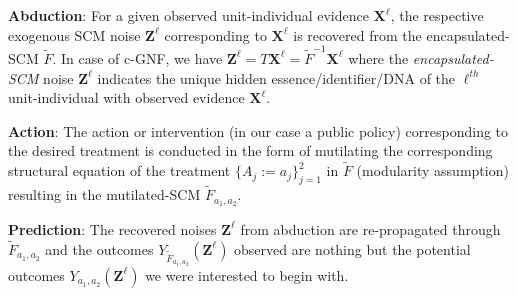 \documentclass[letterpaper]{article} %
\begin{document}
\begin{inparaenum}

    \item \textbf{Abduction}: For a given observed unit-individual evidence $\mathbf{X}^\ell$, the respective exogenous SCM noise $\mathbf{Z}^\ell$ corresponding to $\mathbf{X}^\ell$ is recovered from the encapsulated-SCM $\tilde{F}$. In case of c-GNF, we have $\mathbf{Z}^\ell{ = }T\mathbf{X}^\ell{ = }\tilde{F}^{-1}\mathbf{X}^\ell$ where the \emph{encapsulated-SCM} noise $\mathbf{Z}^\ell$ 
   indicates the unique hidden essence/identifier/DNA
    of the $\ell^{th}$ unit-individual with observed evidence $\mathbf{X}^\ell$.
    
    \item \textbf{Action}: The action or intervention (in our case a public policy) corresponding to the desired treatment is conducted in the form of mutilating the corresponding structural equation of the treatment $\{{A_j}{ := }a_j\}^2_{j{ = }1}$ in $\tilde{F}$ (modularity assumption) resulting in the mutilated-SCM $\tilde{F}_{a_1,a_2}$. 
    
    \item \textbf{Prediction}: The recovered noises $\mathbf{Z}^\ell$ from abduction are re-propagated through $\tilde{F}_{a_1,a_2}$ and the outcomes $Y_{\tilde{F}_{a_1,a_2}}(\mathbf{Z}^\ell)$ observed are nothing but the potential outcomes $Y_{a_1,a_2}(\mathbf{Z}^\ell)$ we were interested to begin with.%
\end{inparaenum}    

\end{document}
